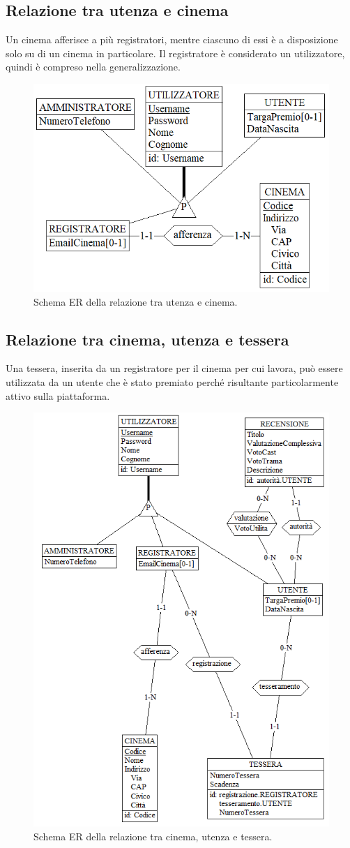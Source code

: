 \documentclass[a4paper,12pt]{report}
\begin{document}
	\subsection{Relazione tra utenza e cinema}
	Un cinema afferisce a più registratori, mentre ciascuno di essi è a disposizione solo su di un cinema in particolare. Il registratore è considerato un utilizzatore, quindi è compreso nella generalizzazione. 
	\begin{figure}[H]
		\centering
		\includegraphics[width=0.7\linewidth]{ER/utenzacinema.png}
		\caption{Schema ER della relazione tra utenza e cinema.}
	\end{figure}
	\subsection{Relazione tra cinema, utenza e tessera}
	Una tessera, inserita da un registratore per il cinema per cui lavora, può essere utilizzata da un utente che è stato premiato perché risultante particolarmente attivo sulla piattaforma. 
	\begin{figure}[H]
		\centering
		\includegraphics[width=0.7\linewidth]{ER/utenzacinematessera.png}
		\caption{Schema ER della relazione tra cinema, utenza e tessera.}
	\end{figure}
\end{document}
